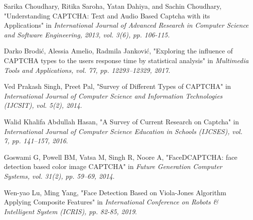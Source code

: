 \begin{thebibliography}{9}




Sarika Choudhary, Ritika Saroha, Yatan Dahiya, and Sachin Choudhary, "Understanding CAPTCHA: Text and Audio Based Captcha with its Applications" in \emph{International Journal of Advanced Research in Computer Science and Software Engineering, 2013, vol. 3(6), pp. 106-115.}

Darko Brodi\'c, Alessia Amelio, Radmila Jankovi\'c, "Exploring the influence of CAPTCHA types to the users response time by statistical analysis" in \emph{Multimedia Tools and Applications, vol. 77, pp. 12293–12329, 2017.}

Ved Prakash Singh, Preet Pal, "Survey of Different Types of CAPTCHA" in \emph{International Journal of Computer Science and Information Technologies (IJCSIT), vol. 5(2), 2014}.

Walid Khalifa Abdullah Hasan, "A Survey of Current Research on Captcha" in \emph{International Journal of Computer Science Education in Schools (IJCSES), vol. 7, pp. 141–157, 2016}.

Goswami G, Powell BM, Vatsa M, Singh R, Noore A, "FaceDCAPTCHA: face detection based color image CAPTCHA" in \emph{Future Generation Computer Systems, vol. 31(2), pp. 59–69, 2014}.

Wen-yao Lu, Ming Yang, "Face Detection Based on Viola-Jones Algorithm Applying Composite Features" in \emph{International Conference on Robots \& Intelligent System (ICRIS), pp. 82-85, 2019}.


\end{thebibliography}
